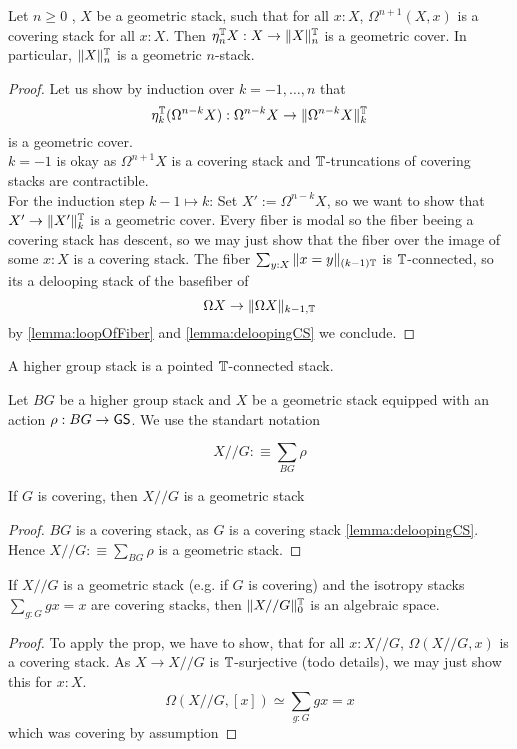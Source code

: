 \begin{prop}{\label{prop:LoopingsImplyGerbe}}
	Let $n \ge 0$ , $X$ be a geometric stack, such that for all $x : X$, $\Omega^{n+1} (X , x)$ is a covering stack for all $x : X$. Then $\eta_n^{\mathbb{T}} X : X \to \|X\|_n^{\mathbb{T}}$ is a geometric cover. In particular, $\|X\|_n^{\mathbb{T}}$ is a geometric $n$-stack.
\end{prop}
\begin{proof}
	Let us show by induction over $k = -1,\hdots,n$ that 
	\[\eta_k^{\mathbb{T}} (\Omega^{n - k} X) : \Omega^{n - k} X \to \|\Omega^{n - k} X\|_k^{\mathbb{T}}\]
	is a geometric cover.  \\
	$k=-1$ is okay as $\Omega^{n+1} X$ is a covering stack and $\mathbb{T}$-truncations of covering stacks are contractible. \\
	For the induction step $k - 1 \mapsto k$:
	Set $X' := \Omega^{n-k} X$, so we want to show that $X' \to \|X'\|_k^{\mathbb{T}}$ is a geometric cover.
	Every fiber is modal so the fiber beeing a covering stack has descent, so we may just show that the fiber over the image of some $x : X$ is a covering stack. The fiber $\sum_{y : X} \| x = y\|_{(k-1)\mathbb{T}}$ is $\mathbb{T}$-connected, so its a delooping stack of the basefiber of 
	\[
	\Omega X  \to \|\Omega X \|_{k-1, \mathbb{T}}
	\]
	by \ref{lemma:loopOfFiber} and \ref{lemma:deloopingCS} we conclude.
\end{proof}


\begin{definition}
	A higher group stack is a pointed $\mathbb{T}$-connected stack.
\end{definition}
Let $BG$ be a higher group stack and $X$ be a geometric stack equipped with an action $\rho : BG \to \mathsf{GS}$. We use the standart notation

\[
X // G :\equiv \sum_{BG} \rho
\]
\begin{lemma}
	If $G$ is covering, then $X // G$ is a geometric stack
\end{lemma}
\begin{proof}
	$BG$ is a covering stack, as $G$ is a covering stack \ref{lemma:deloopingCS}. Hence $X // G :\equiv \sum_{BG} \rho$ is a geometric stack.
\end{proof}
\begin{prop}
	If $X // G$ is a geometric stack (e.g. if $G$ is covering) and the isotropy stacks $\sum_{g : G} g x = x$ are covering stacks, then $\| X // G \|_0^{\mathbb{T}}$ is an algebraic space.
\end{prop}
\begin{proof}
	To apply the prop, we have to show, that for all $x : X // G$, $\Omega (X // G,x)$ is a covering stack. As $X \to X // G$ is $\mathbb{T}$-surjective (todo details), we may just show this for $x : X$.
	\[
	\Omega (X // G , [x]) \simeq \sum_{g: G} g x = x
	\]
	which was covering by assumption
\end{proof}

